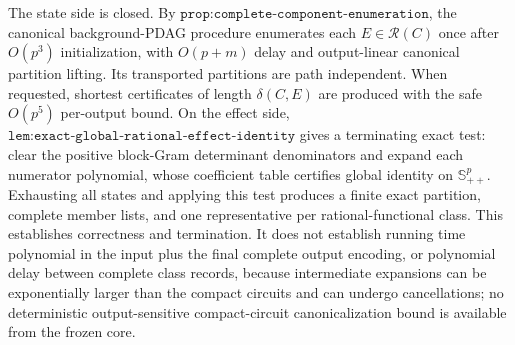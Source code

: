 The state side is closed. By \(\texttt{prop:complete-component-enumeration}\), the canonical background-PDAG procedure enumerates each \(E\in\mathcal R(C)\) once after \(O(p^3)\) initialization, with \(O(p+m)\) delay and output-linear canonical partition lifting. Its transported partitions are path independent. When requested, shortest certificates of length \(\delta(C,E)\) are produced with the safe \(O(p^5)\) per-output bound. On the effect side, \(\texttt{lem:exact-global-rational-effect-identity}\) gives a terminating exact test: clear the positive block-Gram determinant denominators and expand each numerator polynomial, whose coefficient table certifies global identity on \(\mathbb S^p_{++}\). Exhausting all states and applying this test produces a finite exact partition, complete member lists, and one representative per rational-functional class. This establishes correctness and termination. It does not establish running time polynomial in the input plus the final complete output encoding, or polynomial delay between complete class records, because intermediate expansions can be exponentially larger than the compact circuits and can undergo cancellations; no deterministic output-sensitive compact-circuit canonicalization bound is available from the frozen core.
